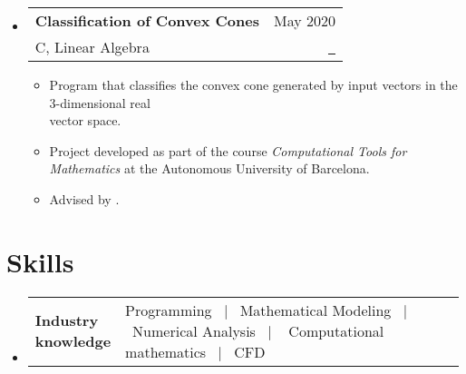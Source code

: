 \documentclass[a4paper,11pt]{article}
\makeatletter
\newcommand{\resumeItemListEnd}{\end{itemize}}
\newcommand{\resumeSectionTypeOne}[2]{
  \item\begin{tabular*}{0.99\textwidth}[t]{
    p{0.18\linewidth}p{0.81\linewidth}
  }
  \textbf{#1} & #2
  \end{tabular*}\vspace{-2pt}
}
\newcommand{\resumeQuadHeading}[4]{
  \item
  \begin{tabular*}{0.96\textwidth}[t]{l@{\extracolsep{\fill}}r}
    \textbf{#1} & \small #2 \\
    \small#3 & \small #4 \\
  \end{tabular*}
}
\newcommand{\resumeHeadingListStart}{
  \begin{itemize}[leftmargin=0.15in, label={}]
}
\newcommand{\resumeHeadingListEnd}{\end{itemize}}
\makeatother
\begin{document}
\resumeHeadingListStart{}
\resumeQuadHeading{Classification of Convex Cones}{May 2020}{C, Linear Algebra}{\href{https://github.com/mathUAB/informatica/tree/main/Projecte\%20final}{\faGithub \ \graydotuline{Source code}}}
\begin{itemize}[leftmargin=3em, itemsep=0.1em, topsep=2pt]
  \item \small Program that classifies the convex cone generated by input vectors in the 3-dimensional real\\ vector space.
  \item \small Project developed as part of the course \textit{Computational Tools for Mathematics} at the Autonomous University of Barcelona.
  \item \small Advised by \href{https://mat.uab.cat/geoarit/index.php/people?controller=member&view=member&id=1}{}.
\end{itemize}
\resumeItemListEnd{}









\section{Skills}
\resumeHeadingListStart{}
\resumeSectionTypeOne{Industry\hspace{1cm} knowledge}{Programming \ $|$ \ Mathematical Modeling \ $|$ \ Numerical Analysis \ $|$ \ \hspace{2cm} Computational mathematics  \ $|$ \ CFD}
\resumeHeadingListEnd{}
\end{document}
